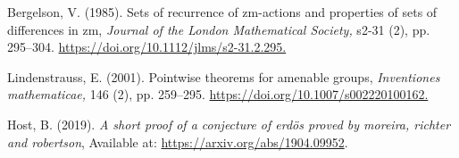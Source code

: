 \documentclass[
  british,
]{article}
\newlength{\cslhangindent}
\newenvironment{CSLReferences}[2] %
 {\begin{list}{}{%
  \setlength{\itemindent}{0pt}
  \setlength{\leftmargin}{0pt}
  \setlength{\parsep}{0pt}
  \ifodd #1
   \setlength{\leftmargin}{\cslhangindent}
   \setlength{\itemindent}{-1\cslhangindent}
  \fi
  \setlength{\itemsep}{#2\baselineskip}}}
 {\end{list}}
\theoremstyle{plain}
\theoremstyle{plain}
\theoremstyle{remark}
\begin{document}
\label{refs}
\begin{CSLReferences}{1}{0}
Bergelson, V. (1985). \textquotesingle Sets of recurrence of zm-actions
and properties of sets of differences in zm\textquotesingle,
\emph{\emph{Journal of the London Mathematical Society},} s2-31 (2), pp.
295--304.
\href{https://doi.org/10.1112/jlms/s2-31.2.295}{https://doi.org/10.1112/jlms/s2-31.2.295.}

Lindenstrauss, E. (2001). \textquotesingle Pointwise theorems for
amenable groups\textquotesingle, \emph{\emph{Inventiones mathematicae},}
146 (2), pp. 259--295.
\href{https://doi.org/10.1007/s002220100162}{https://doi.org/10.1007/s002220100162.}

Host, B. (2019). \textquotesingle{}\emph{A short proof of a conjecture
of erdös proved by moreira, richter and robertson}\textquotesingle,
Available at: \url{https://arxiv.org/abs/1904.09952}.

\end{CSLReferences}
\end{document}
